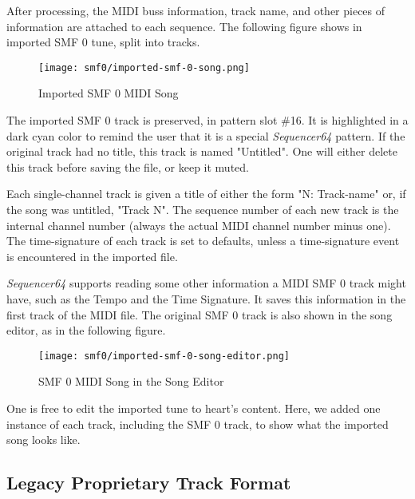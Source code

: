    After processing, the MIDI buss information, track name, and other pieces of
   information are attached to each sequence.  The following figure shows in
   imported SMF 0 tune, split into tracks.

\begin{figure}[H]
   \centering 
   \texttt{[image: smf0/imported-smf-0-song.png]}
   \caption{Imported SMF 0 MIDI Song}
   \label{fig:imported_smf_0_song}
\end{figure}

   The imported SMF 0 track is preserved, in
   pattern slot \#16.  It is highlighted in a dark cyan color to remind the
   user that it is a special \textsl{Sequencer64} pattern.
   If the original track had no
   title, this track is named "Untitled".
   One will either delete
   this track before saving the file, or keep it muted.

   Each single-channel track is given a title of either the form
   "N: Track-name" or, if the song was untitled, "Track N".
   The sequence number of each new track is the internal channel number
   (always the actual MIDI channel number minus one).
   The time-signature of each track is set to defaults, unless a
   time-signature event is encountered in the imported file.

   \textsl{Sequencer64} supports reading some other
   information a MIDI SMF 0 track might have, such as the Tempo and the
   Time Signature.  It saves this information in the first track
   of the MIDI file.
   The original SMF 0 track is also shown in the song editor, as in the
   following figure.

\begin{figure}[H]
   \centering 
   \texttt{[image: smf0/imported-smf-0-song-editor.png]}
   \caption{SMF 0 MIDI Song in the Song Editor}
   \label{fig:imported_smf_0_song_editor}
\end{figure}

   One is free to edit the imported tune to heart's content.
   Here, we added one instance of each track, including the SMF 0 track,
   to show what the imported song looks like.

\subsection{Legacy Proprietary Track Format}
\label{subsec:legacy_midi_format}

